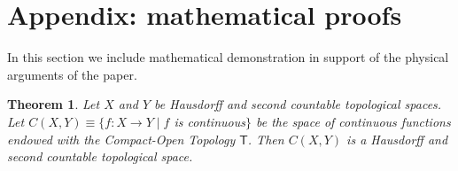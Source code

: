 \documentclass[aps,pra,10pt,twocolumn,floatfix,nofootinbib]{revtex4-1}
\numberwithin{equation}{section}
\newtheorem{thrm}[equation]{Theorem}
\theoremstyle{definition}
\begin{document}


\section{Appendix: mathematical proofs}

In this section we include mathematical demonstration in support of the physical arguments of the paper.

\begin{thrm}\label{thrm:function_topology}
	Let $X$ and $Y$ be Hausdorff and second countable topological spaces. Let $C(X, Y) \equiv \{f: X \rightarrow Y \; | \; f$ is continuous$\}$ be the space of continuous functions endowed with the Compact-Open Topology $\mathsf{T}$. Then $C(X, Y)$ is a Hausdorff and second countable topological space.
\end{thrm}
\end{document}
